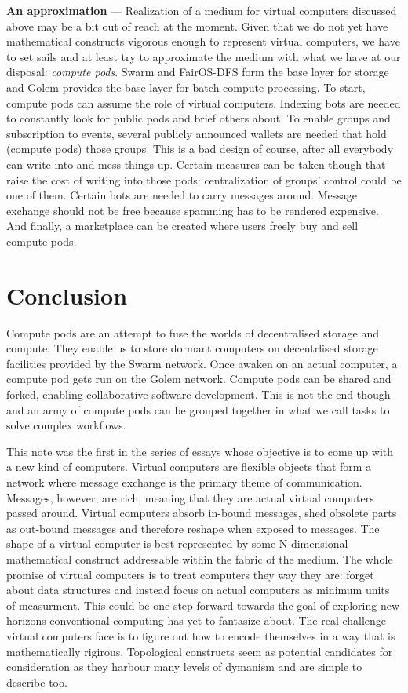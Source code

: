 \documentclass[a4paper, 10pt]{article}
\begin{document}
\textbf{An approximation} --- Realization of a medium for virtual computers discussed above may be a bit out of reach at the moment. Given that we do not yet have mathematical constructs vigorous enough to represent virtual computers, we have to set sails and at least try to approximate the medium with what we have at our disposal: \textit{compute pods}. Swarm and FairOS-DFS form the base layer for storage and Golem provides the base layer for batch compute processing. To start, compute pods can assume the role of virtual computers. Indexing bots are needed to constantly look for public pods and brief others about. To enable groups and subscription to events, several publicly announced wallets are needed that hold (compute pods) those groups. This is a bad design of course, after all everybody can write into and mess things up. Certain measures can be taken though that raise the cost of writing into those pods: centralization of groups' control could be one of them. Certain bots are needed to carry messages around. Message exchange should not be free because spamming has to be rendered expensive. And finally, a marketplace can be created where users freely buy and sell compute pods.

\section*{Conclusion}
Compute pods are an attempt to fuse the worlds of decentralised storage and compute. They enable us to store dormant computers on decentrlised storage facilities provided by the Swarm network. Once awaken on an actual computer, a compute pod gets run on the Golem network. Compute pods can be shared and forked, enabling collaborative software development. This is not the end though and an army of compute pods can be grouped together in what we call tasks to solve complex workflows.
\par
This note was the first in the series of essays whose objective is to come up with a new kind of computers. Virtual computers are flexible objects that form a network where message exchange is the primary theme of communication. Messages, however, are rich, meaning that they are actual virtual computers passed around. Virtual computers absorb in-bound messages, shed obsolete parts as out-bound messages and therefore reshape when exposed to messages. The shape of a virtual computer is best represented by some N-dimensional mathematical construct addressable within the fabric of the medium. The whole promise of virtual computers is to treat computers they way they are: forget about data structures and instead focus on actual computers as minimum units of measurment. This could be one step forward towards the goal of exploring new horizons conventional computing has yet to fantasize about. The real challenge virtual computers face is to figure out how to encode themselves in a way that is mathematically rigirous. Topological constructs seem as potential candidates for consideration as they harbour many levels of dymanism and are simple to describe too.



\end{document}
